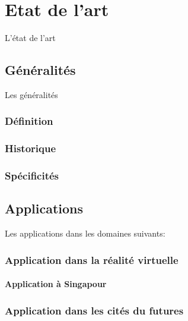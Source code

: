 \setcounter{page}{1}
\chapter{Etat de l'art}
\label{chapter/state_of_art}

L'état de l'art

	\section{Généralités}
	\label{section/generalities}
	
	Les généralités
	
		\subsection{Définition}
		\label{subsection/definition}
		
		\subsection{Historique}
		\label{subsection/history}
		
		\subsection{Spécificités}
		\label{subsection/specificity}
	
	\section{Applications}
	\label{section/applications}
	
	Les applications dans les domaines suivants:
	
		\subsection{Application dans la réalité virtuelle}
		\label{subsection/application_in_vr}
		
			\subsubsection{Application à Singapour}
			\label{subsubsection/application_in_singapour}		
		
		\subsection{Application dans les cités du futures}
		\label{subsection/application_in_real_city}
	